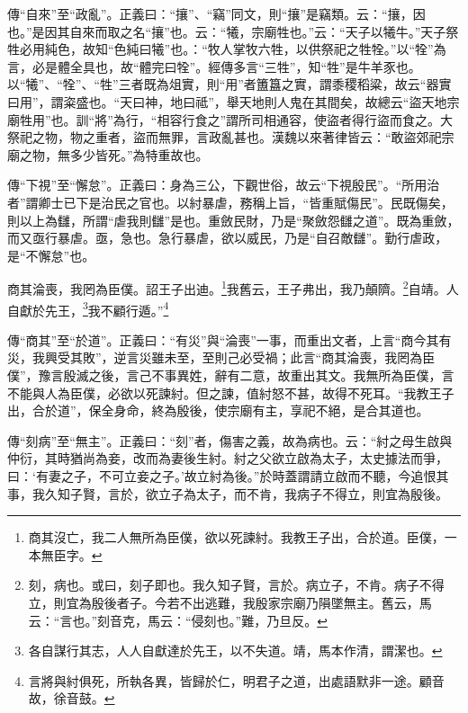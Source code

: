 {\noindent\zhuan{}\fzbyks 傳“自來”至“政亂”。正義曰：“攘”、“竊”同文，則“攘”是竊類。云：“攘，因也。”是因其自來而取之名“攘”也。云：“犧，宗廟牲也。”云：“天子以犧牛。”天子祭牲必用純色，故知“色純曰犧”也。：“牧人掌牧六牲，以供祭祀之牲牷。”以“牷”為言，必是體全具也，故“體完曰牷”。經傳多言“三牲”，知“牲”是牛羊豕也。以“犧”、“牷”、“牲”三者既為俎實，則“用”者簠簋之實，謂黍稷稻粱，故云“器實曰用”，謂粢盛也。“天曰神，地曰祗”，舉天地則人鬼在其間矣，故總云“盜天地宗廟牲用”也。訓“將”為行，“相容行食之”謂所司相通容，使盜者得行盜而食之。大祭祀之物，物之重者，盜而無罪，言政亂甚也。漢魏以來著律皆云：“敢盜郊祀宗廟之物，無多少皆死。”為特重故也。 \par}

{\noindent\zhuan{}\fzbyks 傳“下視”至“懈怠”。正義曰：身為三公，下觀世俗，故云“下視殷民”。“所用治者”謂卿士已下是治民之官也。以紂暴虐，務稱上旨，“皆重賦傷民”。民既傷矣，則以上為讎，所謂“虐我則讎”是也。重斂民財，乃是“聚斂怨讎之道”。既為重斂，而又亟行暴虐。亟，急也。急行暴虐，欲以威民，乃是“自召敵讎”。勤行虐政，是“不懈怠”也。 \par}

商其淪喪，我罔為臣僕。詔王子出迪。\footnote{商其沒亡，我二人無所為臣僕，欲以死諫紂。我教王子出，合於道。臣僕，一本無臣字。}我舊云，王子弗出，我乃顛隮。\footnote{刻，病也。或曰，刻子即也。我久知子賢，言於。病立子，不肯。病子不得立，則宜為殷後者子。今若不出逃難，我殷家宗廟乃隕墜無主。舊云，馬云：“言也。”刻音克，馬云：“侵刻也。”難，乃旦反。}自靖。人自獻於先王，\footnote{各自謀行其志，人人自獻達於先王，以不失道。靖，馬本作清，謂潔也。}我不顧行遁。”\footnote{言將與紂俱死，所執各異，皆歸於仁，明君子之道，出處語默非一途。顧音故，徐音鼓。}

{\noindent\zhuan{}\fzbyks 傳“商其”至“於道”。正義曰：“有災”與“淪喪”一事，而重出文者，上言“商今其有災，我興受其敗”，逆言災雖未至，至則己必受禍；此言“商其淪喪，我罔為臣僕”，豫言殷滅之後，言己不事異姓，辭有二意，故重出其文。我無所為臣僕，言不能與人為臣僕，必欲以死諫紂。但之諫，值紂怒不甚，故得不死耳。“我教王子出，合於道”，保全身命，終為殷後，使宗廟有主，享祀不絕，是合其道也。 \par}

{\noindent\zhuan{}\fzbyks 傳“刻病”至“無主”。正義曰：“刻”者，傷害之義，故為病也。云：“紂之母生啟與仲衍，其時猶尚為妾，改而為妻後生紂。紂之父欲立啟為太子，太史據法而爭，曰：‘有妻之子，不可立妾之子。’故立紂為後。”於時蓋謂請立啟而不聽，今追恨其事，我久知子賢，言於，欲立子為太子，而不肯，我病子不得立，則宜為殷後。 \par}

